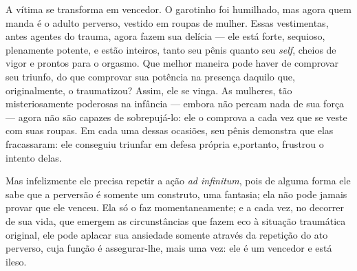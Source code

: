 A vítima se transforma em vencedor. O garotinho foi humilhado, mas
agora quem manda é o adulto perverso, vestido em roupas de mulher.
Essas vestimentas, antes agentes do trauma, agora fazem sua delícia
--- ele está forte, sequioso, plenamente potente, e estão inteiros,
tanto seu pênis quanto seu \textit{self}, cheios de vigor e prontos
para o orgasmo. Que melhor maneira pode haver de comprovar seu triunfo,
do que comprovar sua potência na presença daquilo que, originalmente, o
traumatizou? Assim, ele se vinga. As mulheres, tão misteriosamente
poderosas na infância --- embora não percam nada de sua força ---
agora não são capazes de sobrepujá-lo: ele o comprova a cada vez que se
veste com suas roupas. Em cada uma dessas ocasiões, seu pênis demonstra
que elas fracassaram: ele conseguiu triunfar em defesa própria e,\idxpornoviti[|)]
portanto, frustrou o intento delas.

Mas infelizmente ele precisa\idxpervrepet{} repetir\idxfantanece{} a ação \textit{ad infinitum},
pois de alguma forma ele sabe que a perversão é somente um construto,
uma fantasia; ela não pode jamais provar que ele venceu. Ela só o faz
momentaneamente; e a cada vez, no decorrer de sua vida, que emergem as
circunstâncias que fazem eco à situação traumática original, ele pode
aplacar sua ansiedade somente através da repetição do ato perverso,
cuja função é assegurar-lhe, mais uma vez: ele é um vencedor e está
ileso.

